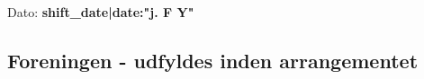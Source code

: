\documentclass[a4paper, 11pt]{article}
\begin{document}
{%
\newpage

\strictpagechecktrue
\checkoddpage
\ifoddpage
\else
\mbox{~}
\clearpage
\fi

{%
{%
{%

\noindent
\small{Dato: \textbf{ {{ shift_date|date:"j. F Y" }} } }

\subsection*{Foreningen - udfyldes inden arrangementet}

}}}}
\end{document}
